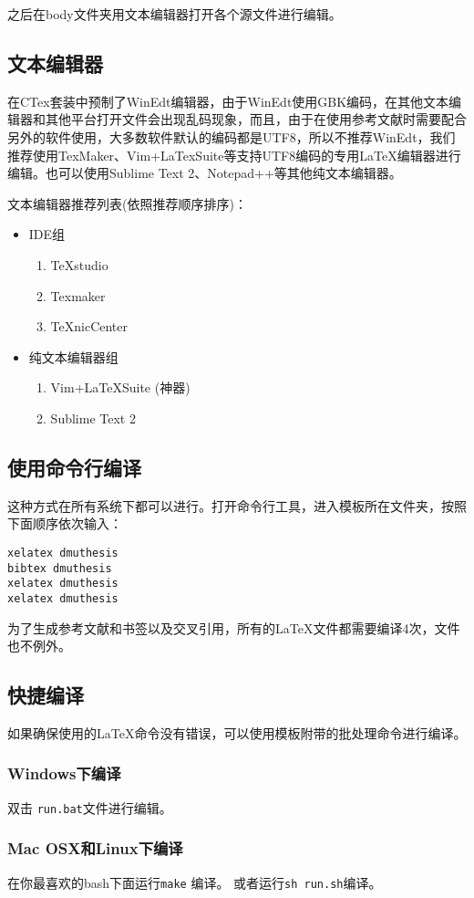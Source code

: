 之后在body文件夹用文本编辑器打开各个源文件进行编辑。

\subsection{文本编辑器}

在CTex套装中预制了WinEdt编辑器，由于WinEdt使用GBK编码，在其他文本编辑器和其他平台打开文件会出现乱码现象，而且，由于在使用参考文献时需要配合另外的软件使用，大多数软件默认的编码都是UTF8，所以不推荐WinEdt，我们推荐使用TexMaker、Vim+LaTexSuite等支持UTF8编码的专用LaTeX编辑器进行编辑。也可以使用Sublime Text 2、Notepad++等其他纯文本编辑器。

文本编辑器推荐列表(依照推荐顺序排序)：

\begin{itemize}
\item IDE组
\begin{enumerate}
	\item TeXstudio
	\item Texmaker
	\item TeXnicCenter
\end{enumerate}
\item{纯文本编辑器组}
\begin{enumerate}
\item Vim+LaTeXSuite (神器)
\item Sublime Text 2
\end{enumerate}
\end{itemize}

\subsection{使用命令行编译}

这种方式在所有系统下都可以进行。打开命令行工具，进入模板所在文件夹，按照下面顺序依次输入：
\begin{verbatim}
xelatex dmuthesis
bibtex dmuthesis
xelatex dmuthesis
xelatex dmuthesis
\end{verbatim}
为了生成参考文献和书签以及交叉引用，所有的\LaTeX 文件都需要编译4次，\XeLaTeX 文件也不例外。


\subsection{快捷编译}

如果确保使用的\LaTeX 命令没有错误，可以使用模板附带的批处理命令进行编译。
\subsubsection{Windows下编译}

双击 \texttt{run.bat}文件进行编辑。

\subsubsection{Mac OSX和Linux下编译}

在你最喜欢的bash下面运行\texttt{make} 编译。
或者运行\texttt{sh run.sh}编译。


